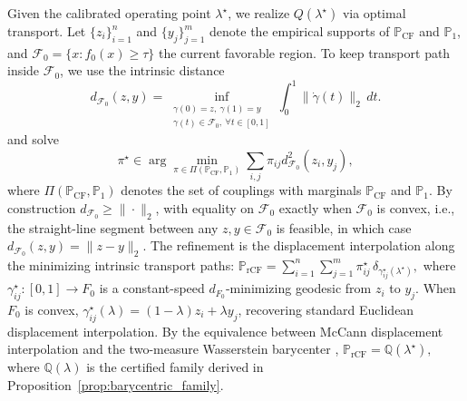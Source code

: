 Given the calibrated operating point $\lambda^\star$, we realize $Q(\lambda^\star)$ via optimal transport. 
Let $\{z_i\}_{i=1}^{n}$ and $\{y_j\}_{j=1}^{m}$ denote the empirical supports of
$\mathbb{P}_{\mathrm{CF}}$ and $\mathbb{P}_1$, and
$
\mathcal{F}_0
=
\{x : f_0(x) \ge \tau\}
$
the current favorable region. To keep transport path inside $\mathcal{F}_0$, we use the intrinsic distance
\[
d_{\mathcal{F}_0}(z,y)
=
\inf_{\substack{\gamma(0)=z,\ \gamma(1)=y\\
                 \gamma(t)\in\mathcal{F}_0,\ \forall t\in[0,1]}}
\int_0^1 \|\dot{\gamma}(t)\|_2\,dt.
\] and solve
\begin{equation}
\pi^\star
\in
\arg\min_{\pi\in\Pi(
\mathbb{P}_{\mathrm{CF}},\mathbb{P}_1)}
\sum_{i,j}
\pi_{ij}
d_{\mathcal{F}_0}^2(z_i,y_j),
\label{eq:optimal_transport}
\end{equation}
where
$\Pi(\mathbb{P}_{\mathrm{CF}},\mathbb{P}_1)$ denotes the set of
couplings with marginals
$\mathbb{P}_{\mathrm{CF}}$ and $\mathbb{P}_1$. %
By construction $d_{\mathcal F_0}\ge\|\cdot\|_2$, with equality on $\mathcal F_0$ exactly when $\mathcal{F}_0$ is convex, i.e., 
the straight-line segment between any
$z,y\in\mathcal{F}_0$ is feasible, in which case 
$d_{\mathcal{F}_0}(z,y)=\|z-y\|_2$.
The refinement is the displacement
interpolation along the minimizing intrinsic transport paths:
$
\mathbb{P}_{\mathrm{rCF}}
=
\sum_{i=1}^{n}
\sum_{j=1}^{m}
\pi_{ij}^\star
\,
\delta_{\gamma_{ij}^\star(\lambda^\star)},
\label{eq:refined_cf}
$
where $\gamma_{ij}^\star:[0,1]\rightarrow F_0$ is a constant-speed
$d_{F_0}$-minimizing geodesic from $z_i$ to $y_j$.
When $F_0$ is convex, $\gamma_{ij}^\star(\lambda)
=(1-\lambda)z_i+\lambda y_j$, recovering standard Euclidean
displacement interpolation.
By the equivalence between McCann displacement interpolation and the
two-measure Wasserstein barycenter
\citep{agueh2011barycenters},
$
\mathbb{P}_{\mathrm{rCF}}
=
\mathbb{Q}(\lambda^\star),
$
where $\mathbb{Q}(\lambda)$ is the certified family derived in
Proposition~\ref{prop:barycentric_family}.

